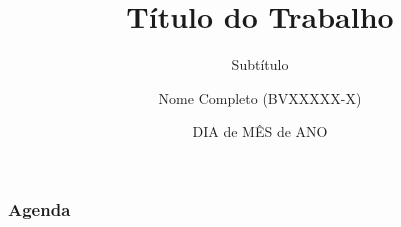 \documentclass[aspectratio=169]{beamer}
\makeatletter
\def\@courseLabel{}
\newcommand{\course}[1]{\def\@courseLabel{#1}}
\makeatother
\begin{document}
\title{Título do Trabalho}
\subtitle{Subtítulo}
\course{Curso}
\author{Nome Completo (BVXXXXX-X)}
\date{DIA de MÊS de ANO}


\begin{frame}[plain]
    
      
    \titlepage
\end{frame}

\section[Agenda]{}

\begin{frame}
    \frametitle{Agenda}
    \tableofcontents
\end{frame}






\end{document}
